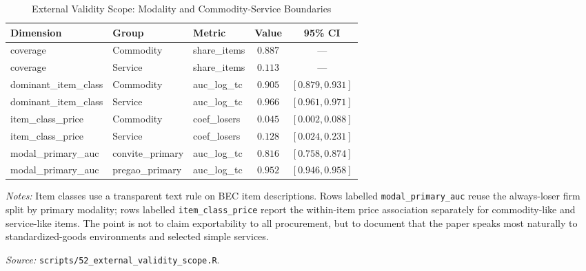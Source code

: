 \begin{table}[htbp]
\centering
\caption{External Validity Scope: Modality and Commodity-Service Boundaries}
\label{tab:external_validity_scope}
\begin{threeparttable}
\small
\begin{tabular}{lllcc}
\toprule
Dimension & Group & Metric & Value & 95\% CI \\
\midrule
coverage & Commodity & share\_items & $0.887$ & --- \\
coverage & Service & share\_items & $0.113$ & --- \\
dominant\_item\_class & Commodity & auc\_log\_tc & $0.905$ & $[0.879, 0.931]$ \\
dominant\_item\_class & Service & auc\_log\_tc & $0.966$ & $[0.961, 0.971]$ \\
item\_class\_price & Commodity & coef\_losers & $0.045$ & $[0.002, 0.088]$ \\
item\_class\_price & Service & coef\_losers & $0.128$ & $[0.024, 0.231]$ \\
modal\_primary\_auc & convite\_primary & auc\_log\_tc & $0.816$ & $[0.758, 0.874]$ \\
modal\_primary\_auc & pregao\_primary & auc\_log\_tc & $0.952$ & $[0.946, 0.958]$ \\
\bottomrule
\end{tabular}
\begin{tablenotes}
\small
\item \textit{Notes:} Item classes use a transparent text rule on BEC item descriptions. Rows labelled \texttt{modal\_primary\_auc} reuse the always-loser firm split by primary modality; rows labelled \texttt{item\_class\_price} report the within-item price association separately for commodity-like and service-like items. The point is not to claim exportability to all procurement, but to document that the paper speaks most naturally to standardized-goods environments and selected simple services.
\item \textit{Source:} \texttt{scripts/52\_external\_validity\_scope.R}.
\end{tablenotes}
\end{threeparttable}
\end{table}

